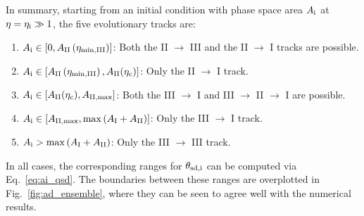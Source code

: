 \documentclass[
        fleqn,
        usenatbib,
    ]{mnras}
\newcommand*{\p}[1]{\left(#1\right)}
\newcommand*{\s}[1]{\left[#1\right]}
\begin{document}
In summary, starting from an initial condition with phase space area $A_{\rm i}$
at $\eta = \eta_{\rm i} \gg 1$, the five evolutionary tracks are:
\begin{enumerate}
    \item $A_{\rm i} \in \s{0, A_{\rm II}\p{\eta_{\rm \min, III}}}$: Both the II
        $\to$ III and the II $\to$ I tracks are possible.

    \item $A_{\rm i} \in \s{A_{\rm II}\p{\eta_{\rm \min, III}}, A_{\rm
        II}(\eta_{\rm c})}$: Only the II $\to$ I track.

    \item $A_{\rm i} \in \s{A_{\rm II}(\eta_{\rm c}), A_{\rm II, \max}}$:
        Both the III $\to$ I and III $\to$ II $\to$ I are possible.

    \item $A_{\rm i} \in \s{A_{\rm II, \max}, \max \p{A_{\rm I} + A_{\rm II}}}$:
        Only the III $\to$ I track.

    \item $A_{\rm i} > \max \p{A_{\rm I} + A_{\rm II}}$: Only the III $\to$ III
        track.
\end{enumerate}
In all cases, the corresponding ranges for $\theta_{\rm sd,i}$ can be computed via
Eq.~\eqref{eq:ai_qsd}. The boundaries between these ranges are overplotted in
Fig.~\ref{fig:ad_ensemble}, where they can be seen to agree well with the
numerical results.
\end{document}
